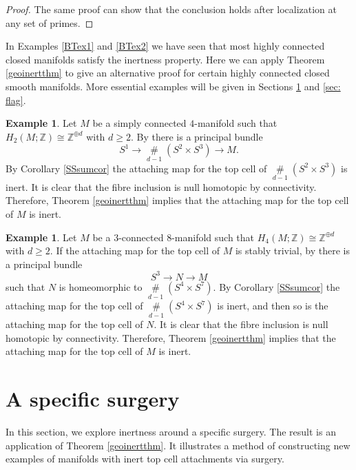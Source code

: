 \documentclass[a4]{amsart}
\theoremstyle{definition}
\newtheorem{example}[theorem]{Example}
\begin{document}
\begin{sloppypar}
\begin{proof}
The same proof can show that the conclusion holds after localization at any set of primes.
\end{proof}


In Examples \ref{BTex1} and \ref{BTex2} we have seen that most highly connected closed manifolds satisfy the inertness property. Here we can apply Theorem \ref{geoinertthm} to give an alternative proof for certain highly connected closed smooth manifolds. More essential examples will be given in Sections \ref{sec: surgery} and \ref{sec: flag}. 

\begin{example}\label{DLex}
Let $M$ be a simply connected $4$-manifold such that $H_2(M;\mathbb{Z})\cong \mathbb{Z}^{\oplus d}$ with $d\geq 2$. By \cite[Corollary 1]{DL05} there is a principal bundle
\[
S^1\stackrel{}{\longrightarrow} \mathop{\#}\limits_{d-1} (S^2\times S^3) \stackrel{}{\longrightarrow} M.
\]
By Corollary \ref{SSsumcor} the attaching map for the top cell of $\mathop{\#}\limits_{d-1} (S^2\times S^3)$ is inert. 
It is clear that the fibre inclusion is null homotopic by connectivity. Therefore, Theorem \ref{geoinertthm} implies that the attaching map for the top cell of $M$ is inert.
\end{example}

\begin{example}\label{BGSex}
Let $M$ be a $3$-connected $8$-manifold such that $H_4(M;\mathbb{Z})\cong \mathbb{Z}^{\oplus d}$ with $d\geq 2$. If the attaching map for the top cell of $M$ is stably trivial, by \cite[Theorem B]{BGS24} there is a principal bundle
\[
S^3\stackrel{}{\longrightarrow} N \stackrel{}{\longrightarrow} M
\]
such that $N$ is homeomorphic to $\mathop{\#}\limits_{d-1} (S^4\times S^7)$. 
By Corollary \ref{SSsumcor} the attaching map for the top cell of $\mathop{\#}\limits_{d-1} (S^4\times S^7)$ is inert, and then so is the attaching map for the top cell of $N$. 
It is clear that the fibre inclusion is null homotopic by connectivity. Therefore, Theorem \ref{geoinertthm} implies that the attaching map for the top cell of $M$ is inert.
\end{example}

\newpage
\section{A specific surgery}
\label{sec: surgery}
In this section, we explore inertness around a specific surgery. The result is an application of Theorem \ref{geoinertthm}. It illustrates a method of constructing new examples of manifolds with inert top cell attachments via surgery. 


\end{sloppypar}
\end{document}
